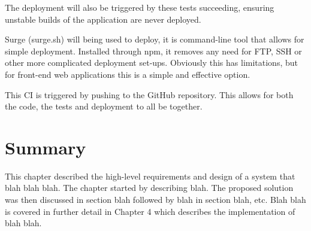 The deployment will also be triggered by these tests succeeding, ensuring unstable builds of the application are never deployed.

Surge (surge.sh) will being used to deploy, it is command-line tool that allows for simple deployment. Installed through npm, it removes any need for FTP, SSH or other more complicated deployment set-ups. Obviously this has limitations, but for front-end web applications this is a simple and effective option. \cite{surge}

This CI is triggered by pushing to the GitHub repository. This allows for both the code, the tests and deployment to all be together.

\section{Summary} \label{a-d--summary}

This chapter described the high-level requirements and design of a system that blah blah blah.  The chapter started by describing blah.  The proposed solution was then discussed in section blah followed by blah in section blah, etc.
Blah blah is covered in further detail in Chapter 4 which describes the implementation of blah blah.

